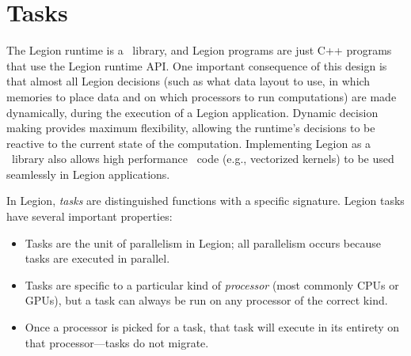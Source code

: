 \chapter{Tasks}
\label{chap:tasks}


The Legion runtime is a \Cpp\ library, and
Legion programs are just C++ programs that use the Legion runtime API.
One important consequence of this design is that almost all Legion decisions
(such as what data layout to use, in which memories to place data and on which
processors to run computations) are made dynamically,  during the execution of 
a Legion application.  Dynamic decision making provides maximum flexibility, 
allowing the runtime's decisions to be reactive to the current state of the computation.
Implementing Legion as a \Cpp\ library also allows high performance \Cpp\ code
(e.g., vectorized kernels) to be used seamlessly in Legion applications.

In Legion, {\em tasks} are distinguished functions with a specific signature.
Legion tasks have several important properties:
\begin{itemize}
\item Tasks are the unit of parallelism in Legion; all parallelism occurs because tasks are executed in parallel.

\item Tasks are specific to a particular kind of {\em processor} (most commonly CPUs or GPUs), but a task can always be run on any processor
of the correct kind.

\item Once a processor is picked for a task, that task will execute in its entirety on that processor---tasks do
not migrate.  

\end{itemize}


